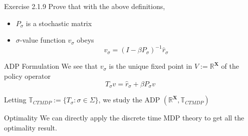 \documentclass[aspectratio=169]{beamer} %
\begin{document}
\begin{frame}{Exercise 2.1.9}
Prove that with the above definitions,
\begin{itemize}
    \item $P_\sigma$ is a stochastic matrix
    \item $\sigma$-value function $v_\sigma$ obeys
    $$
    v_\sigma = (I-\beta P_\sigma)^{-1} \hat{r}_\sigma 
    $$
\end{itemize}
    
\end{frame}

\begin{frame}{ADP Formulation}
We see that $v_\sigma$ is the unique fixed point in $V:=\mathbb{R}^{\mathbf{X}}$ of the policy operator
$$
T_\sigma v = \hat{r}_\sigma +\beta P_\sigma v
$$

Letting $\mathbb{T}_{CTMDP}:=\{T_\sigma:\sigma \in\Sigma\}$, we study the ADP $(\mathbb{R}^{\mathbf{X}}, \mathbb{T}_{CTMDP})$
\end{frame}


\begin{frame}{Optimality}
We can directly apply the discrete time MDP theory to get all the optimality result.
\end{frame}
\end{document}
